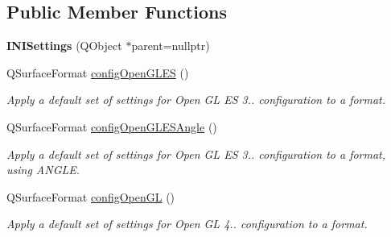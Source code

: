 \subsection*{Public Member Functions}
\begin{DoxyCompactItemize}
\item 
\mbox{\label{classrev_1_1_settings_1_1_i_n_i_settings_ab1823937ecc5463c5a3d20cca45874a9}} 
{\bfseries I\+N\+I\+Settings} (Q\+Object $\ast$parent=nullptr)
\item 
\mbox{\label{classrev_1_1_settings_1_1_i_n_i_settings_aed88887fb88ad86a784e7446bea06d0f}} 
Q\+Surface\+Format \mbox{\hyperlink{classrev_1_1_settings_1_1_i_n_i_settings_aed88887fb88ad86a784e7446bea06d0f}{config\+Open\+G\+L\+ES}} ()
\begin{DoxyCompactList}\small\item\em Apply a default set of settings for Open GL ES 3.. configuration to a format. \end{DoxyCompactList}\item 
\mbox{\label{classrev_1_1_settings_1_1_i_n_i_settings_a274f4e583d142416a2408faa866586ad}} 
Q\+Surface\+Format \mbox{\hyperlink{classrev_1_1_settings_1_1_i_n_i_settings_a274f4e583d142416a2408faa866586ad}{config\+Open\+G\+L\+E\+S\+Angle}} ()
\begin{DoxyCompactList}\small\item\em Apply a default set of settings for Open GL ES 3.. configuration to a format, using A\+N\+G\+LE. \end{DoxyCompactList}\item 
\mbox{\label{classrev_1_1_settings_1_1_i_n_i_settings_a54ef290d8bd09d9b3ffb2322db744a9c}} 
Q\+Surface\+Format \mbox{\hyperlink{classrev_1_1_settings_1_1_i_n_i_settings_a54ef290d8bd09d9b3ffb2322db744a9c}{config\+Open\+GL}} ()
\begin{DoxyCompactList}\small\item\em Apply a default set of settings for Open GL 4.. configuration to a format. \end{DoxyCompactList}\item 
\mbox{\label{classrev_1_1_settings_1_1_i_n_i_settings_a9e17e49c5dce9840f85e01dfc14d9630}} 

\end{DoxyCompactItemize}
